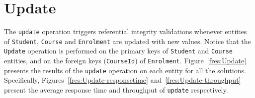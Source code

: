 
\section{Update} \label{s:results-update}
The \texttt{update} operation triggers  referential integrity validations
whenever entities of \texttt{Student},  \texttt{Course} and \texttt{Enrolment}
are updated with new values. Notice that the \texttt{Update} operation is
performed  on the primary keys of \texttt{Student} and \texttt{Course} entities,
 and on the foreign keys (\texttt{CourseId}) of \texttt{Enrolment}.
Figure~\ref{fres:Update} presents the results of the \texttt{update} operation
on each entity for all the solutions. Specifically, 
Figures~\ref{fres:Update-responsetime} and~\ref{fres:Update-throughput} present
the average response time and throughput of \texttt{update} respectively.

